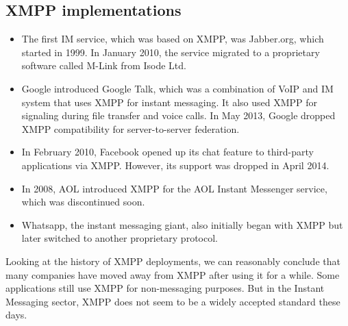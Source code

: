 \documentclass[11pt, conference, a4paper]{IEEEtran}
\begin{document}
\subsection{XMPP implementations}
\begin{itemize}
\item The first IM service, which was based on XMPP, was Jabber.org, which started in 1999. In January 2010, the service migrated to a proprietary software called M-Link from Isode Ltd.
\item Google introduced Google Talk, which was a combination of VoIP and IM system that uses XMPP for instant messaging. It also used XMPP for signaling during file transfer and voice calls. In May 2013, Google dropped XMPP compatibility for server-to-server federation.
\item In February 2010, Facebook opened up its chat feature to third-party applications via XMPP. However, its support was dropped in April 2014.
\item In 2008, AOL introduced XMPP for the AOL Instant Messenger service, which was discontinued soon.
\item Whatsapp, the instant messaging giant, also initially began with XMPP but later switched to another proprietary protocol. \cite{xmpp-whatsapp}
\end{itemize}
Looking at the history of XMPP deployments, we can reasonably conclude that many companies have moved away from XMPP after using it for a while. Some applications still use XMPP for non-messaging purposes. But in the Instant Messaging sector, XMPP does not seem to be a widely accepted standard these days.
\end{document}
